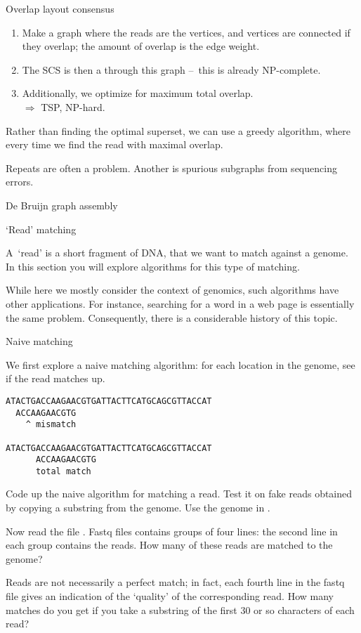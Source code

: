  {Overlap layout consensus}

\begin{enumerate}
\item Make a graph where the reads are the vertices,
  and vertices are connected if they overlap; the amount of overlap
  is the edge weight.
\item The \ac{SCS} is then a  through this graph
  --~this is already NP-complete.
\item Additionally, we optimize for maximum total overlap.\\
  $\Rightarrow$ \acf{TSP}, NP-hard.
\end{enumerate}

Rather than finding the optimal superset,
we can use a greedy algorithm,
where every time we find the read with maximal overlap.

Repeats are often a problem.
Another is spurious subgraphs from sequencing errors.

 {De Bruijn graph assembly}

 {`Read' matching}

A~`read' is a short fragment of DNA, that we want to match against a
genome. In this section you will explore algorithms for this type
of matching.

While here we mostly consider the context of genomics, such
algorithms have other applications.
For instance, searching for a word in a web page
is essentially the same problem.
Consequently, there is a considerable history of this topic.

 {Naive matching}

We first explore a naive matching algorithm: for each location
in the genome, see if the read matches up.
\begin{verbatim}
ATACTGACCAAGAACGTGATTACTTCATGCAGCGTTACCAT
  ACCAAGAACGTG
    ^ mismatch

ATACTGACCAAGAACGTGATTACTTCATGCAGCGTTACCAT
      ACCAAGAACGTG
      total match
\end{verbatim}

\begin{exercise}
  \label{ex:readmatch}
  Code up the naive algorithm for matching a read. Test it on fake
  reads obtained by copying a substring from the
  genome. Use the genome in .

  Now read the  file
  . Fastq files contains groups of four
  lines: the second line in each group contains the reads.
  How many of these reads are matched to the genome?

  Reads are not necessarily a perfect match; in fact, each fourth line
  in the fastq file gives an indication of the `quality' of the
  corresponding read. How many matches do you get if you take a
  substring of the first 30 or so characters of each read?
\end{exercise}

